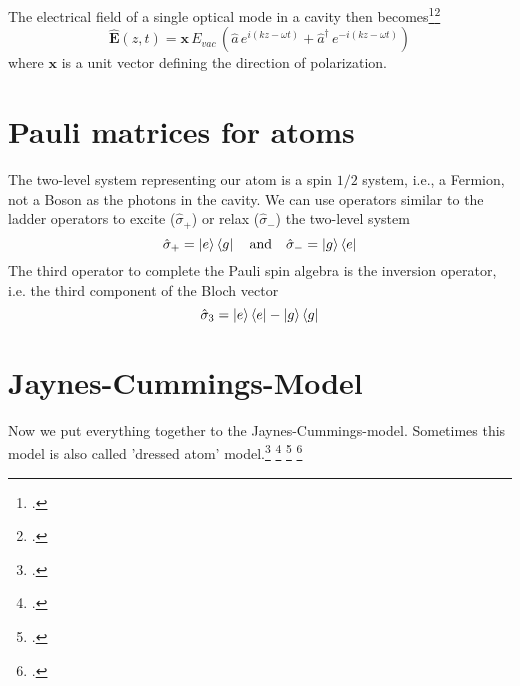 The electrical field of a single optical mode in a cavity then becomes\footcite[chap. 2.1 and 2.4]{GerryKnight2005}\footcite[chap. 6.1]{Rand2016}
\begin{equation}
\hat{\boldsymbol{E}}(z,t) = \boldsymbol{x} \, E_{vac} \, (\hat{a} \, e^{i (k z - \omega t)} + \hat{a}^\dagger   \, e^{-i (k z - \omega t)} ) 
\end{equation}
where $\boldsymbol{x}$ is a unit vector defining the direction of polarization. 

\section{Pauli matrices for atoms}

The two-level system representing our atom is a spin $1/2$ system, i.e., a Fermion, not a Boson as the photons in the cavity. We can use operators similar to the ladder operators to excite ($  \hat{\sigma}_+$) or relax ($  \hat{\sigma}_-$) the two-level system
\begin{equation}
 \hat{\sigma}_+ = \ket{e} \bra{g} \quad \text{and} \quad 
  \hat{\sigma}_- = \ket{g} \bra{e}
\end{equation}
The third operator to complete the Pauli spin algebra is the inversion operator, i.e. the third component of the Bloch vector
\begin{equation}
 \hat{\sigma}_3 = \ket{e} \bra{e} - \ket{g} \bra{g}
\end{equation} 



\section{Jaynes-Cummings-Model}
Now we put everything together to  the Jaynes-Cummings-model. Sometimes this model is also called 'dressed atom' model.\footcite[chap. 6.8]{Rand2016} \footcite[chap. 4.5]{GerryKnight2005} \footcite[chap. 10.4]{Fox}  \footcite[chap. 3.4]{HarocheRaimond2006}

